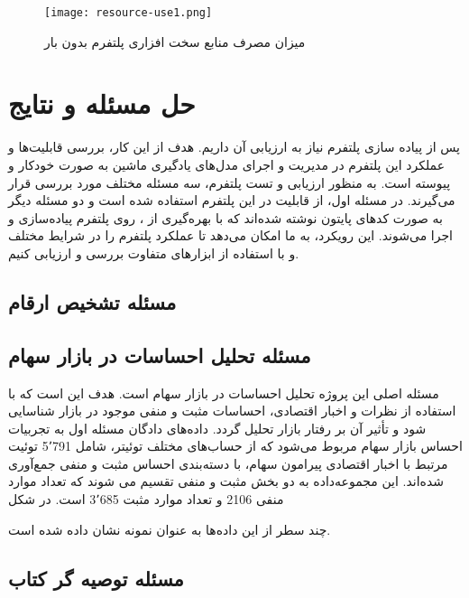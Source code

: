\begin{figure}[!b]
	\centering
	\texttt{[image: resource-use1.png]}
	\caption{میزان مصرف منابع سخت افزاری پلتفرم بدون بار}
	\label{fig: resource use no load}
\end{figure}
\clearpage
\section{حل مسئله و نتایج}
 
پس از پیاده سازی پلتفرم  نیاز به ارزیابی آن داریم. هدف از این کار، بررسی قابلیت‌ها و عملکرد این پلتفرم در مدیریت و اجرای مدل‌های یادگیری ماشین به صورت خودکار و پیوسته است. به منظور ارزیابی و تست پلتفرم، سه مسئله مختلف مورد بررسی قرار می‌گیرند. در مسئله اول، از قابلیت  در این پلتفرم استفاده شده است و دو مسئله دیگر به صورت کدهای پایتون نوشته شده‌اند که با بهره‌گیری از ، روی پلتفرم پیاده‌سازی و اجرا می‌شوند. این رویکرد، به ما امکان می‌دهد تا عملکرد پلتفرم را در شرایط مختلف و با استفاده از ابزارهای متفاوت بررسی و ارزیابی کنیم.

\subsection{مسئله تشخیص ارقام}
\subsection{مسئله تحلیل احساسات در بازار سهام}

مسئله اصلی این پروژه تحلیل احساسات در بازار سهام است. هدف این است که با استفاده از نظرات و اخبار اقتصادی، احساسات مثبت و منفی موجود در بازار شناسایی شود و تأثیر آن بر رفتار بازار تحلیل گردد. داده‌های دادگان مسئله اول به تجربیات احساس بازار سهام مربوط می‌شود  که از حساب‌های مختلف توئیتر، شامل 5٬791 توئیت مرتبط با اخبار اقتصادی پیرامون سهام، با دسته‌بندی احساس مثبت و منفی جمع‌آوری شده‌اند. این مجموعه‌داده به دو بخش مثبت و منفی تقسیم می شوند که تعداد موارد منفی 2106 و تعداد موارد مثبت 3٬685 است. در شکل 

 چند سطر از این داده‌ها به عنوان نمونه نشان داده شده است.





\subsection{مسئله توصیه گر کتاب}